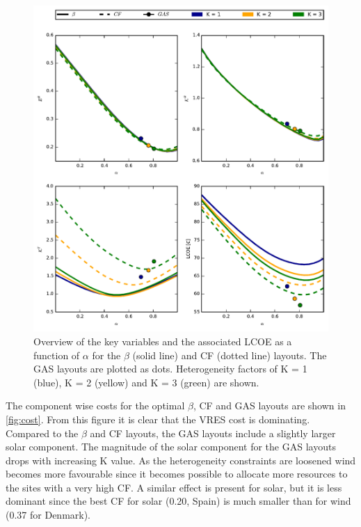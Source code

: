 \documentclass[a4paper, 5p, sort&compress]{elsarticle}%
\begin{document}
\begin{figure}[p]
  \centering
  \includegraphics[width = 2 \columnwidth]{dataSync}
  \caption{Overview of the key variables and the associated LCOE as a
    function of $\alpha$ for the $\beta$ (solid line) and CF (dotted
    line) layouts. The GAS layouts are plotted as dots. Heterogeneity
    factors of K = 1 (blue), K = 2 (yellow) and K = 3 (green) are
    shown.}
  \label{fig:overview}
\end{figure}

The component wise costs for the optimal $\beta$, CF and GAS layouts
are shown in \cref{fig:cost}. From this figure it is clear that the
VRES cost is dominating. Compared to the $\beta$ and CF layouts, the
GAS layouts include a slightly larger solar component. The
magnitude of the solar component for the GAS layouts drops with
increasing K value. As the heterogeneity constraints are loosened wind
becomes more favourable since it becomes possible to allocate more
resources to the sites with a very high CF. A similar effect is
present for solar, but it is less dominant since the best CF for solar
(0.20, Spain) is much smaller than for wind (0.37 for Denmark).
\end{document}
